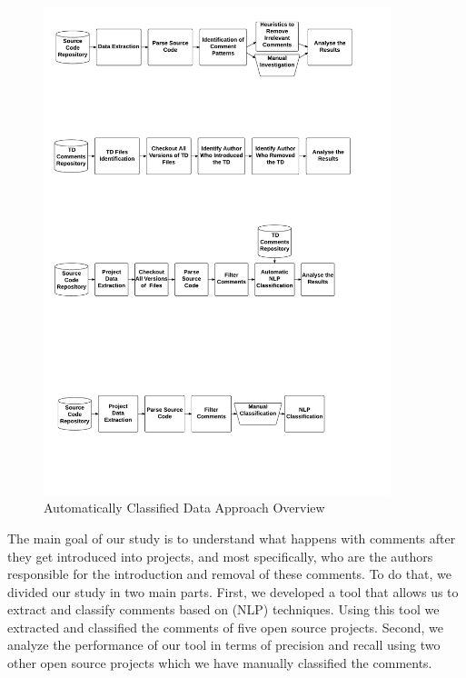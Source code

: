 
\begin{figure}[thb!]
  \centering
  \includegraphics[width=0.90\textwidth]{figures/automatically_classified_data_approach2.pdf}
  \caption{Automatically Classified Data Approach Overview}
  \label{fig:automatically_classified_data_approach_overview}
\end{figure}

The main goal of our study is to understand what happens with \SATD comments after they get introduced into projects, and most specifically, who are the authors responsible for the introduction and removal of these comments. To do that, we divided our study in two main parts. First, we developed a tool that allows us to extract and classify \SATD comments based on  (NLP) techniques. Using this tool we extracted and classified the comments of five open source projects. Second, we analyze the performance of our tool in terms of precision and recall using two other open source projects which we have manually classified the \SATD comments. 

